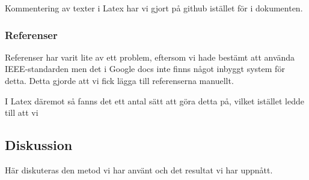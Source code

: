 
Kommentering av texter i Latex har vi gjort på github istället för i dokumenten.


\subsubsection{Referenser}
Referenser har varit lite av ett problem, eftersom vi hade bestämt att använda IEEE-standarden men det i Google docs inte finns något inbyggt system för detta. Detta gjorde att vi fick lägga till referenserna manuellt.



I Latex däremot så fanns det ett antal sätt att göra detta på, vilket istället ledde till att vi 

\subsection{Diskussion}
Här diskuteras den metod vi har använt och det resultat vi har uppnått.



